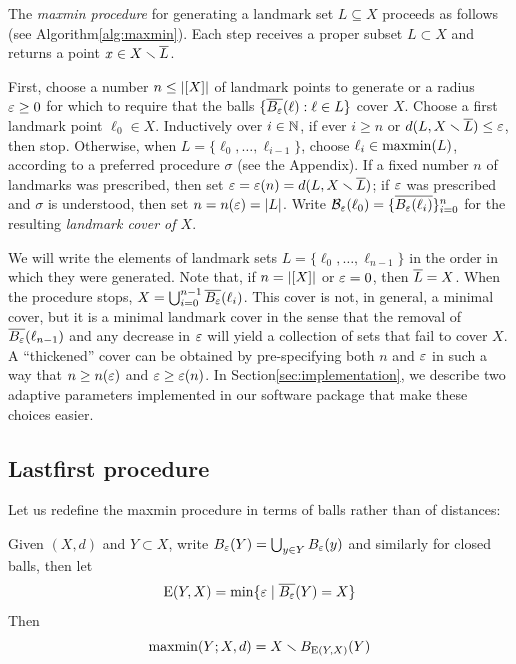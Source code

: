 \documentclass[
]{article}
\begin{document}
The \emph{maxmin procedure} for generating a landmark set
\(L\subseteq X\) proceeds as follows (see
Algorithm\nbs\ref{alg:maxmin}). Each step receives a proper subset
\(L\subset X\) and returns a point \(x\in X\smallsetminus \overline{L}\).

First, choose a number \(n\leq\lvert [X]\rvert\) of landmark points to generate
or a radius \(\varepsilon\geq 0\) for which to require that the balls
\(\{ \overline{B_{\varepsilon}}(\ell) : \ell \in L \}\) cover \(X\). Choose a first
landmark point \(\ell_0\in X\). Inductively over \(i\in\mathbb{N}\), if ever
\(i\geq n\) or \(d(L,X\smallsetminus \overline{L})\leq\varepsilon\), then stop. Otherwise, when
\(L=\{\ell_0,\ldots,\ell_{i-1}\}\), choose \(\ell_i\in\operatorname{maxmin}(L)\),
according to a preferred procedure \(\sigma\) (see the Appendix). If a
fixed number \(n\) of landmarks was prescribed, then set
\(\varepsilon=\varepsilon(n)=d(L,X\smallsetminus \overline{L})\); if \(\varepsilon\) was prescribed and
\(\sigma\) is understood, then set \(n=n(\varepsilon)=\lvert L\rvert\). Write
\(\mathcal{B}_\varepsilon(\ell_0)=\{\overline{B_{\varepsilon}(\ell_i)}\}_{i=0}^{n}\) for the
resulting \emph{landmark cover of $X$}.

We will write the elements of landmark sets
\(L=\{\ell_0,\ldots,\ell_{n-1}\}\) in the order in which they were
generated. Note that, if \(n=\lvert [X]\rvert\) or \(\varepsilon=0\), then
\(\overline{L}=X\). When the procedure stops,
\(X=\bigcup_{i=0}^{n-1}{\overline{B_{\varepsilon}}(\ell_i)}\). This cover is not, in
general, a minimal cover, but it is a minimal landmark cover in the
sense that the removal of \(\overline{B_\varepsilon}(\ell_{n-1})\) and any decrease
in \(\varepsilon\) will yield a collection of sets that fail to cover \(X\). A
``thickened'' cover can be obtained by pre-specifying both \(n\) and
\(\varepsilon\) in such a way that \(n \geq n(\varepsilon)\) and
\(\varepsilon \geq \varepsilon(n)\). In Section\nbs\ref{sec:implementation}, we
describe two adaptive parameters implemented in our software package
that make these choices easier.

\hypertarget{lastfirst-procedure}{%
\subsection{Lastfirst procedure}\label{lastfirst-procedure}}

Let us redefine the maxmin procedure in terms of balls rather than of
distances:

\begin{proposition}\label{prop:maxmin}
    Given $(X,d)$ and $Y \subset X$, write $B_\varepsilon(Y) = \bigcup_{y \in Y}{B_\varepsilon(y)}$ and similarly for closed balls, then let
    $${\mathrm{E}}(Y,X) = \min\{ \varepsilon \mid \overline{B_\varepsilon}(Y) = X \}$$
    Then
    $$\operatorname{maxmin}(Y;X,d) = X \smallsetminus B_{{\mathrm{E}}(Y,X)}(Y)$$
\end{proposition}
\end{document}
